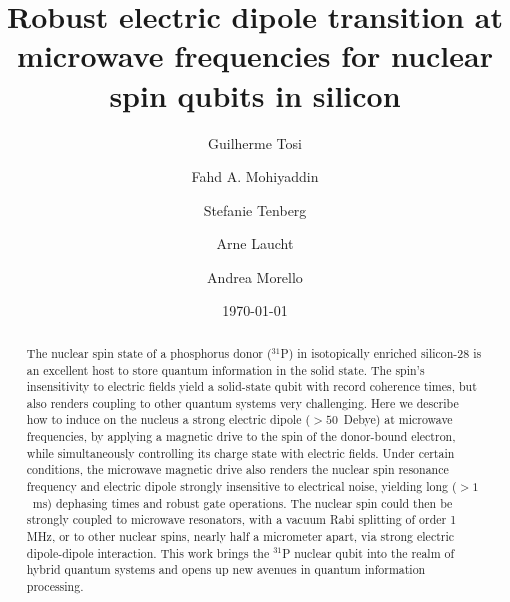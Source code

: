 \documentclass[
 aps,prb,twocolumn,
 amsmath,amssymb,superscriptaddress,
] {revtex4-1}
\begin{document}
\title[]{Robust electric dipole transition at microwave frequencies for nuclear spin qubits in silicon}

\author{Guilherme Tosi}
\author{Fahd A. Mohiyaddin}
\author{Stefanie Tenberg}
\author{Arne Laucht}
\author{Andrea Morello}

\date{\today}

\begin{abstract}

The nuclear spin state of a phosphorus donor ($^{31}$P) in isotopically enriched silicon-28 is an excellent host to store quantum information in the solid state. The spin's insensitivity to electric fields yield a solid-state qubit with record coherence times, but also renders coupling to other quantum systems very challenging. Here we describe how to induce on the nucleus a strong electric dipole ($>50$~Debye) at microwave frequencies, by applying a magnetic drive to the spin of the donor-bound electron, while simultaneously controlling its charge state with electric fields. Under certain conditions, the microwave magnetic drive also renders the nuclear spin resonance frequency and electric dipole strongly insensitive to electrical noise, yielding long ($>1$~ms) dephasing times and robust gate operations. The nuclear spin could then be strongly coupled to microwave resonators, with a vacuum Rabi splitting of order 1 MHz, or to other nuclear spins, nearly half a micrometer apart, via strong electric dipole-dipole interaction. This work brings the $^{31}$P nuclear qubit into the realm of hybrid quantum systems and opens up new avenues in quantum information processing.


\end{abstract}
\end{document}
